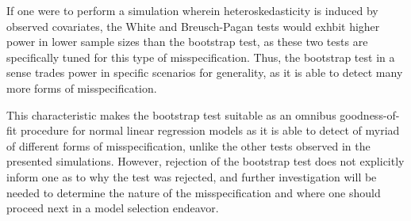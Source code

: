 		If one were to perform a simulation wherein heteroskedasticity is induced by observed covariates, the White and Breusch-Pagan tests would exhbit higher power in lower
		sample sizes than the bootstrap test, as these two tests are specifically tuned for this type of misspecification. Thus, the bootstrap test in a sense trades power in specific
		scenarios for generality, as it is able to detect many more forms of misspecification.
		
		This characteristic makes the bootstrap test suitable as an omnibus goodness-of-fit procedure for normal linear regression models as it is able to detect of myriad of different
		forms of misspecification, unlike the other tests observed in the presented simulations. However, rejection of the bootstrap test does not explicitly inform one as to why the test
		was rejected, and further investigation will be needed to determine the nature of the misspecification and where one should proceed next in a model selection endeavor.



